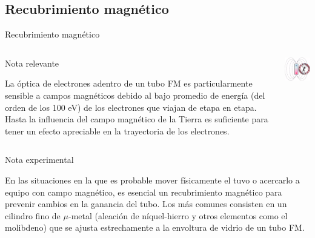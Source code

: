 \documentclass[a4paper,10pt]{beamer}
\begin{document}
\subsection{Recubrimiento magnético}
\begin{frame}{Recubrimiento magnético}
 
 
 \begin{columns}[c]
 
\column{2in}
 \begin{block}{Nota relevante}
  \begin{justify}
  \footnotesize
   La óptica de electrones adentro de un tubo FM es particularmente sensible a campos 
   magnéticos debido al bajo promedio de energía (del orden de los 100 eV) de los 
   electrones que viajan de etapa en etapa. Hasta la influencia del campo magnético 
   de la Tierra es suficiente para tener un efecto apreciable en la trayectoria de 
   los electrones.
  \end{justify}
  \end{block}
    
  \column{2in}
  
  \includegraphics[scale=0.55]{fig51}

   \end{columns}
   
   
  \begin{exampleblock}{Nota experimental}
   \begin{justify}
    En las situaciones en la que es probable mover físicamente el tuvo o 
    acercarlo a equipo con campo magnético, es esencial un recubrimiento magnético 
    para prevenir cambios en la ganancia del tubo. Los más comunes consisten 
    en un cilindro fino de $\mu$-metal (aleación de níquel-hierro y otros elementos 
    como el molibdeno) que se ajusta estrechamente a la envoltura de vidrio de 
    un tubo FM.
   \end{justify}
    \end{exampleblock}

\end{frame}
\end{document}
